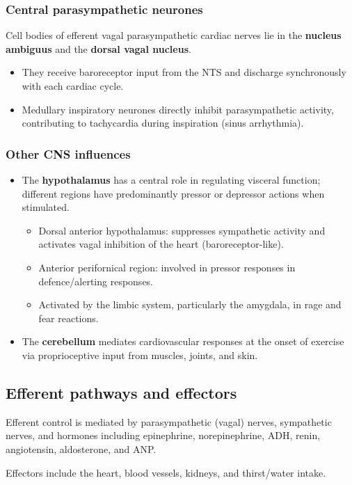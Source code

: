 \documentclass[11pt,a4paper]{article}
\begin{document}
\subsubsection{Central parasympathetic neurones}
Cell bodies of efferent vagal parasympathetic cardiac nerves lie in the \textbf{nucleus ambiguus} and the \textbf{dorsal vagal nucleus}.
\begin{itemize}
\item They receive baroreceptor input from the NTS and discharge synchronously with each cardiac cycle.
\item Medullary inspiratory neurones directly inhibit parasympathetic activity, contributing to tachycardia during inspiration (sinus arrhythmia).
\end{itemize}

\subsubsection{Other CNS influences}
\begin{itemize}
\item The \textbf{hypothalamus} has a central role in regulating visceral function; different regions have predominantly pressor or depressor actions when stimulated.
  \begin{itemize}
  \item Dorsal anterior hypothalamus: suppresses sympathetic activity and activates vagal inhibition of the heart (baroreceptor-like).
  \item Anterior perifornical region: involved in pressor responses in defence/alerting responses.
  \item Activated by the limbic system, particularly the amygdala, in rage and fear reactions.
  \end{itemize}
\item The \textbf{cerebellum} mediates cardiovascular responses at the onset of exercise via proprioceptive input from muscles, joints, and skin.
\end{itemize}

\subsection{Efferent pathways and effectors}
Efferent control is mediated by parasympathetic (vagal) nerves, sympathetic nerves, and hormones including epinephrine, norepinephrine, ADH, renin, angiotensin, aldosterone, and ANP.

Effectors include the heart, blood vessels, kidneys, and thirst/water intake.
\end{document}
